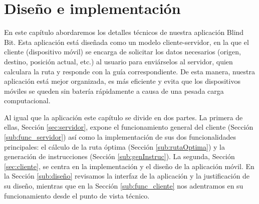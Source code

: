 \chapter{Diseño e implementación}
\label{cap:diseñoeimplementación}


En este capítulo abordaremos los detalles técnicos de nuestra aplicación Blind Bit. Esta aplicación está diseñada como un modelo cliente-servidor, en la que el cliente (dispositivo móvil) se encarga de solicitar los datos necesarios (origen, destino, posición actual, etc.) al usuario para enviárselos al servidor, quien calculara la ruta y responde con la guía correspondiente. De esta manera, nuestra aplicación está mejor organizada, es más eficiente y evita que los dispositivos móviles se queden sin batería rápidamente a causa de una pesada carga computacional.

Al igual que la aplicación este capítulo se divide en dos partes. La primera de ellas, Sección \ref{sec:servidor}, expone el funcionamiento general del cliente (Sección \ref{sub:func_servidor}) así como la implementación de sus dos funcionalidades principales: el cálculo de la ruta óptima (Sección \ref{sub:rutaOptima}) y la generación de instrucciones (Sección \ref{sub:genInstruc}). La segunda, Sección \ref{sec:cliente}, se centra en la implementación y el diseño de la aplicación móvil. En la Sección \ref{sub:diseño} revisamos la interfaz de la aplicación y la justificación de su diseño, mientras que en la Sección \ref{sub:func_cliente} nos adentramos en su funcionamiento desde el punto de vista técnico.



